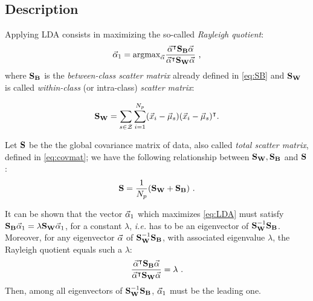 \subsection{Description} Applying LDA consists in maximizing the so-called {\em Rayleigh quotient}:
 \begin{equation}\label{eq:LDA}
 \vec{\alpha}_1=\mathrm{argmax}_{\vec{\alpha}} \frac{\vec{\alpha}^\intercal \textbf{S}_{\textbf{B}} \vec{\alpha}}{\vec{\alpha}^\intercal \textbf{S}_{\textbf{W}} \vec{\alpha}} \mbox{ ,}
 \end{equation}
where $\textbf{S}_{\textbf{B}}$ is the {\em between-class scatter matrix} already defined in \eqref{eq:SB} and $\textbf{S}_{\textbf{W}}$ is called 
{\em within-class} (or intra-class) {\em scatter matrix}:

\begin{equation}
\textbf{S}_{\textbf{W}} = \sum_{s\in\mathcal{Z}}\sum_{i=1}^{N_p}(\vec{x}_i-\vec{\mu}_{s})(\vec{x}_i-\vec{\mu}_{s})^\intercal \mbox{.}
\end{equation}


\begin{remark}
Let $\textbf{S}$ be the the global covariance matrix of data, also called {\em total scatter matrix}, defined in \eqref{eq:covmat}; we have the following relationship between $\textbf{S}_{\textbf{W}},\textbf{S}_{\textbf{B}}$ and $\textbf{S}$:
\begin{equation}
\textbf{S} = \frac{1}{N_p}(\textbf{S}_{\textbf{W}} + \textbf{S}_{\textbf{B}}) \mbox{ .}
\end{equation}
\end{remark}

It can be shown that the vector $\vec{\alpha}_1$ which maximizes \eqref{eq:LDA} must satisfy $\textbf{S}_{\textbf{B}}\vec{\alpha}_1 = \lambda \textbf{S}_{\textbf{W}} \vec{\alpha}_1$, for a constant $\lambda$, \textit{i.e.} has to be an eigenvector of $\textbf{S}_{\textbf{W}}^{-1} \textbf{S}_{\textbf{B}}$. Moreover, for any eigenvector $\vec{\alpha}$ of $\textbf{S}_{\textbf{W}}^{-1}\textbf{S}_{\textbf{B}}$, with associated eigenvalue $\lambda$, the Rayleigh quotient equals such a $\lambda$:
\begin{equation}\label{eq:lambdas}
\frac{\vec{\alpha}^\intercal \textbf{S}_{\textbf{B}} \vec{\alpha}}{\vec{\alpha}^\intercal \textbf{S}_{\textbf{W}} \vec{\alpha}} = \lambda \mbox{ .}
\end{equation}
Then, among all eigenvectors of $\textbf{S}_{\textbf{W}}^{-1} \textbf{S}_{\textbf{B}}$, $\vec{\alpha}_1$ must be the leading one. \\

